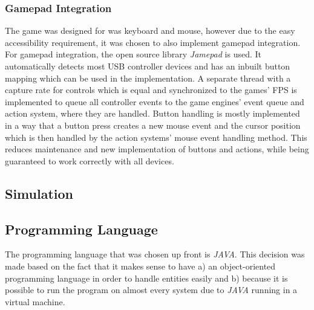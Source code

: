 \subsubsection{Gamepad Integration}\label{subsubsec:gamepad-integration}
The game was designed for was keyboard and mouse, however due to the easy accessibility requirement, it was chosen to also implement gamepad integration.
For gamepad integration, the open source library \textit{Jamepad} is used.
It automatically detects most USB controller devices and has an inbuilt button mapping which can be used in the implementation.
A separate thread with a capture rate for controls which is equal and synchronized to the games' FPS is implemented to queue all controller
events to the game engines' event queue and action system, where they are handled.
Button handling is mostly implemented in a way that a button press creates a new mouse event and the cursor position which is then handled by the action
systems' mouse event handling method.
This reduces maintenance and new implementation of buttons and actions, while being guaranteed to work correctly with all devices.

\subsection{Simulation}
\subsection{Programming Language}\label{subsec:programming-language}
The programming language that was chosen up front is \textit{JAVA}.
This decision was made based on the fact that it makes sense to have a) an object-oriented programming language in order to
handle entities easily and b) because it is possible to run the program on almost every system due to \textit{JAVA} running
in a virtual machine.



